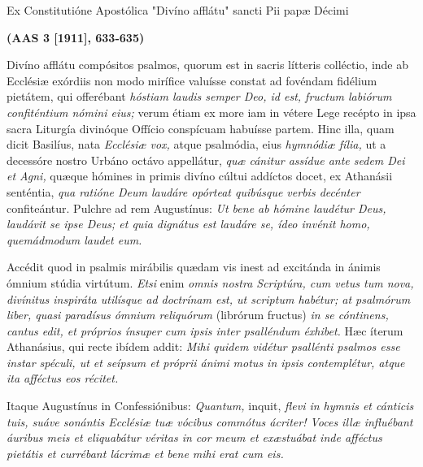 \documentclass[options]{article}
\begin{document}
	
Ex Constitutióne Apostólica "Divíno afflátu" sancti Pii papæ Décimi 
	
	\textbf{(AAS 3 [1911], 633-635)}
	
	Divíno afflátu compósitos psalmos, quorum est in sacris lítteris colléctio, inde ab Ecclésiæ exórdiis non modo mirífice valuísse constat ad fovéndam fidélium pietátem, qui offerébant 
	\textit{hóstiam laudis semper Deo, id est, fructum labiórum confiténtium nómini eius;}
	verum étiam ex more iam in vétere Lege recépto in ipsa sacra Liturgía divinóque Offício conspícuam habuísse partem. Hinc illa, quam dicit Basilíus, nata  
	\textit{Ecclésiæ vox,}
	atque psalmódia, eius 
	\textit{hymnódiæ fília,}
	ut a decessóre nostro Urbáno octávo appellátur, 
	\textit{quæ cánitur assídue ante sedem Dei et Agni,}
	quæque hómines in primis divíno cúltui addíctos docet, ex Athanásii senténtia, 
	\textit{qua ratióne Deum laudáre opórteat quibúsque verbis decénter}
	confiteántur. Pulchre ad rem Augustínus: 
	\textit{Ut bene ab hómine laudétur Deus, laudávit se ipse Deus; et quia dignátus est laudáre se, ídeo invénit homo, quemádmodum laudet eum.}
	
	Accédit quod in psalmis mirábilis quædam vis inest ad excitánda in ánimis ómnium stúdia virtútum. 
	\textit{Etsi}
	enim 
	\textit{omnis nostra Scriptúra, cum vetus tum nova, divínitus inspiráta utilísque ad doctrínam est, ut scriptum habétur; at psalmórum liber, quasi paradísus ómnium reliquórum } 
	(librórum fructus) 
	\textit{in se cóntinens, cantus edit, et próprios ínsuper cum ipsis inter psalléndum éxhibet.}
	Hæc íterum Athanásius, qui recte ibídem addit: 
	\textit{Mihi quidem vidétur psallénti psalmos esse instar spéculi, ut et seípsum et próprii ánimi motus in ipsis contemplétur, atque ita afféctus eos récitet.}
	
	Itaque Augustínus in Confessiónibus:
	\textit{Quantum,}
	inquit,
	\textit{flevi in hymnis et cánticis tuis, suáve sonántis Ecclésiæ tuæ vócibus commótus ácriter! Voces illæ influébant áuribus meis et eliquabátur véritas in cor meum et exæstuábat inde afféctus pietátis et currébant lácrimæ et bene mihi erat cum eis.}
	
\end{document}
